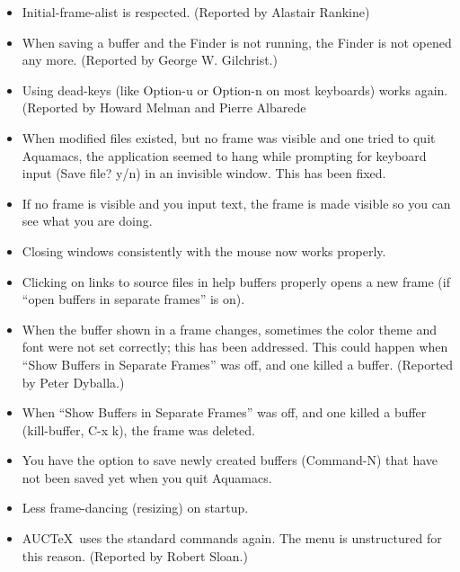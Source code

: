 \begin{itemize}

\item Initial-frame-alist is respected. (Reported by Alastair Rankine)


\item When saving a buffer and the Finder is not running, 
	the Finder is not opened any more. (Reported by George W. Gilchrist.)

\item Using dead-keys (like Option-u or Option-n on most
	keyboards) works again. (Reported by Howard Melman and Pierre Albarede
\item When modified files existed, but no frame was visible and
    one tried to quit Aquamacs, the application seemed to hang while
    prompting for keyboard input (Save file? y/n) in an invisible
    window. This has been fixed. 

\item If no frame is visible and you input text, the frame is  made
    visible so you can see what you are doing.

\item Closing windows consistently with the mouse now works properly. 

\item Clicking on links to source files in help buffers properly
    opens a new frame (if ``open buffers in separate frames'' is on).

\item When the buffer shown in a frame changes, sometimes the
    color theme and font were not set correctly; this has been addressed. This could happen when
    ``Show Buffers in Separate Frames'' was off, and one killed a
    buffer. (Reported by Peter Dyballa.)

\item When ``Show Buffers in Separate Frames'' was off, and one killed a
    buffer (kill-buffer, C-x k), the frame was deleted.

\item You have the option to save newly created buffers (Command-N)
    that have not been saved yet when you quit Aquamacs.

\item Less frame-dancing (resizing) on startup.

\item AUC\TeX\ uses the standard commands again. The menu is
  unstructured for this reason. (Reported by Robert Sloan.)


\end{itemize}
